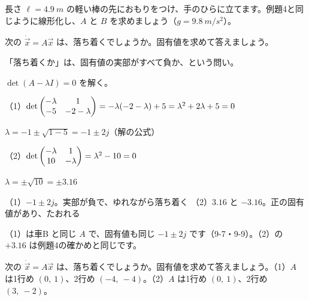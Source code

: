\begin{jibun}
長さ $\ell=\qty{4.9}{m}$ の軽い棒の先におもりをつけ、手のひらに立てます。例題4と同じように線形化し、$A$ と $B$ を求めましょう（$g=\qty{9.8}{m/s^2}$）。
\end{jibun}

\begin{reidai}[落ち着くかの判定]
次の $\dot{\vec x}=A\vec x$ は、落ち着くでしょうか。固有値を求めて答えましょう。
\kangaekata {}\par
{}\enspace 「落ち着くか」は、固有値の実部がすべて負か、という問い。\par
{}\enspace $\det(A-\lambda I)=0$ を解く。\par
\shiki\kixks{}\zw{} （1）$\det\kixkpm{-\lambda&1\\-5&-2-\lambda}=-\lambda(-2-\lambda)+5=\lambda^2+2\lambda+5=0$\par
\kixkb $\lambda=-1\pm\sqrt{1-5}=-1\pm2j$\quad （解の公式）\par
\kixka （2）$\det\kixkpm{-\lambda&1\\10&-\lambda}=\lambda^2-10=0$\par
\kixkb $\lambda=\pm\sqrt{10}=\pm3.16$\par
\kotae （1）$-1\pm2j$。実部が負で、ゆれながら落ち着く
\kixka （2）$3.16$ と $-3.16$。正の固有値があり、たおれる
\end{reidai}

（1）は車B と同じ $A$ で、固有値も同じ $-1\pm2j$ です（9-7・9-9）。（2）の $+3.16$ は例題4の確かめと同じです。

\begin{jibun}
次の $\dot{\vec x}=A\vec x$ は、落ち着くでしょうか。固有値を求めて答えましょう。（1）$A$ は1行め $(0,\ 1)$、2行め $(-4,\ -4)$。（2）$A$ は1行め $(0,\ 1)$、2行め $(3,\ -2)$。
\end{jibun}

